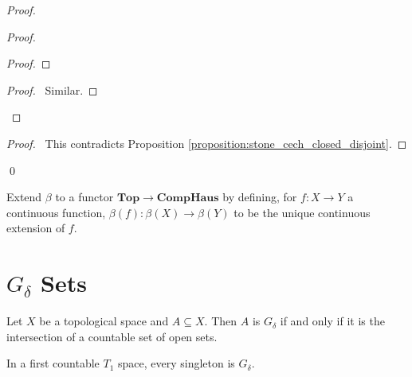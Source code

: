 \begin{proof}
    \pf
    \begin{proof}
        \begin{proof}
        \end{proof}
        \begin{proof}
            \pf\ Similar.
        \end{proof}
    \end{proof}
    \qedstep
    \begin{proof}
        \pf\ This contradicts Proposition \ref{proposition:stone_cech_closed_disjoint}.
    \end{proof}
    \qed
\end{proof}

\begin{definition}
    Extend $\beta$ to a functor $\mathbf{Top} \rightarrow \mathbf{CompHaus}$ by defining,
    for $f : X \rightarrow Y$ a continuous function, $\beta(f) : \beta(X) \rightarrow \beta(Y)$
    to be the unique continuous extension of $f$.
\end{definition}

\section{$G_\delta$ Sets}

\begin{definition}
    Let $X$ be a topological space and $A \subseteq X$. Then $A$ is \emph{$G_\delta$}
    if and only if it is the intersection of a countable set of open sets.
\end{definition}

\begin{proposition}
    In a first countable $T_1$ space, every singleton is $G_\delta$.
\end{proposition}

